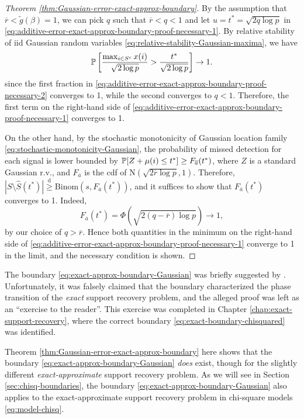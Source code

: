 \begin{proof}[Theorem \ref{thm:Gaussian-error-exact-approx-boundary}]
By the assumption that $\overline{r}<\widetilde{g}(\beta)=1$, we can pick $q$ such that $\overline{r}<q<1$ and let $u = t^*=\sqrt{2q\log{p}}$ in \eqref{eq:additive-error-exact-approx-boundary-proof-necessary-1}.
By relative stability of iid Gaussian random variables \eqref{eq:relative-stability-Gaussian-maxima}, we have
\begin{equation} \label{eq:additive-error-exact-approx-boundary-proof-necessary-2}
    \P\left[\frac{\max_{i\in S^c} x(i)}{\sqrt{2\log{p}}} > \frac{t^*}{\sqrt{2\log{p}}}\right] \to 1.
\end{equation}
since the first fraction in \eqref{eq:additive-error-exact-approx-boundary-proof-necessary-2} converges to 1, while the second converges to $q<1$.
Therefore, the first term on the right-hand side of \eqref{eq:additive-error-exact-approx-boundary-proof-necessary-1} converges to 1.

On the other hand, by the stochastic monotonicity of Gaussian location family \eqref{eq:stochastic-monotonicity-Gaussian}, the probability of missed detection for each signal is lower bounded by $\P[Z+\mu(i) \le t^*] \ge F_{\overline{a}}(t^*)$, where $Z$ is a standard Gaussian r.v., and $F_{\overline{a}}$ is the cdf of $\mathrm{N}(\sqrt{2\overline{r}\log{p}}, 1)$.
Therefore, $|{S}\setminus\widehat{S}(t^*)| \stackrel{\mathrm{d}}{\ge} \text{Binom}(s, {F_{\overline{a}}}(t^*))$, and it suffices to show that ${F_{\overline{a}}}(t^*)$ converges to 1.
Indeed,
\begin{equation*}
    {F_{\overline{a}}}(t^*) = \Phi(\sqrt{2(q-\overline{r})\log{p}}) \to 1,
\end{equation*}
by our choice of $q>\overline{r}$.
Hence both quantities in the minimum on the right-hand side of \eqref{eq:additive-error-exact-approx-boundary-proof-necessary-1} converge to 1 in the limit, and the necessary condition is shown.
\end{proof}





\begin{remark}
The boundary \eqref{eq:exact-approx-boundary-Gaussian} was briefly suggested by \citet{arias2017distribution}.
Unfortunately, it was falsely claimed that the boundary characterized the phase transition of the \emph{exact} support recovery problem, and the alleged proof was left as an ``exercise to the reader''.
This exercise was completed in Chapter \ref{chap:exact-support-recovery}, where the correct boundary \eqref{eq:exact-boundary-chisquared} was identified. 

Theorem \ref{thm:Gaussian-error-exact-approx-boundary} here shows that the boundary \eqref{eq:exact-approx-boundary-Gaussian} \emph{does} exist, though for the slightly different \emph{exact-approximate} support recovery problem.
As we will see in Section \ref{sec:chisq-boundaries}, the boundary \eqref{eq:exact-approx-boundary-Gaussian} also applies to the exact-approximate support recovery problem in chi-square models \eqref{eq:model-chisq}.
\end{remark}

